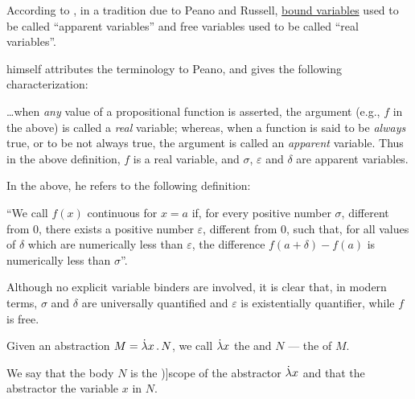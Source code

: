 \begin{remark}\label{rem:apparent_variables}
  According to \cite[11]{Church1956LogicVol1}, in a tradition due to Peano and Russell, \hyperref[con:variable_binding]{bound variables} used to be called \enquote{apparent variables} and free variables used to be called \enquote{real variables}.

   himself attributes the terminology to Peano, and gives the following characterization:
  \begin{displayquote}
    \ldots when \textit{any} value of a propositional function is asserted, the argument (e.g., \( f \) in the above) is called a \textit{real} variable; whereas, when a function is said to be \textit{always} true, or to be not always true, the argument is called an \textit{apparent} variable. Thus in the above definition, \( f \) is a real variable, and \( \sigma \), \( \varepsilon \) and \( \delta \) are apparent variables.
  \end{displayquote}

  In the above, he refers to the following definition:
  \begin{displayquote}
    \enquote{We call \( f(x) \) continuous for \( x = a \) if, for every positive number \( \sigma \), different from \( 0 \), there exists a positive number \( \varepsilon \), different from \( 0 \), such that, for all values of \( \delta \) which are numerically less than \( \varepsilon \), the difference \( f(a + \delta) - f(a) \) is numerically less than \( \sigma \)}.
  \end{displayquote}

  Although no explicit variable binders are involved, it is clear that, in modern terms, \( \sigma \) and \( \delta \) are universally quantified and \( \varepsilon \) is existentially quantifier, while \( f \) is free.
\end{remark}

\begin{definition}\label{def:lambda_abstractor}
  Given an abstraction \( M = \qabs x N \), we call \( \mathord{\dot{{\mathrm \lambda}}} x \) the  and \( N \) --- the  of \( M \).

  We say that the body \( N \) is the \term[ru=область действия (\cite[64]{Герасимов2011Вычислимость})]{scope} of the abstractor \( \mathord{\dot{{\mathrm \lambda}}} x \) and that the abstractor  the variable \( x \) in \( N \).
\end{definition}

